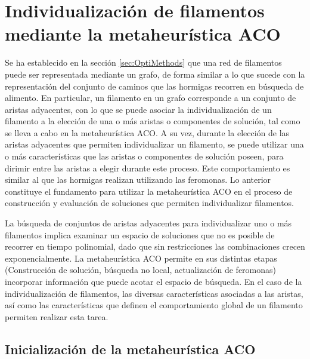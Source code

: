 \section{Individualizaci\'on de filamentos mediante la metaheur\'istica ACO}
Se ha establecido en la secci\'on \ref{sec:OptiMethods} que una red de filamentos puede ser representada mediante un grafo, de forma similar a lo que sucede con la representaci\'on del conjunto de caminos que las hormigas recorren en b\'usqueda de alimento. En particular, un filamento en un grafo corresponde a un conjunto de aristas adyacentes, con lo que se puede asociar la individualizaci\'on de un filamento a la elecci\'on de una o m\'as aristas o componentes de soluci\'on, tal como se lleva a cabo en la metaheur\'istica ACO. A su vez, durante la elecci\'on de las aristas adyacentes que permiten individualizar un filamento, se puede utilizar una o m\'as caracter\'isticas que las aristas o componentes de soluci\'on poseen, para dirimir entre las aristas a elegir durante este proceso. Este comportamiento es similar al que las hormigas realizan utilizando las feromonas. Lo anterior constituye el fundamento para utilizar la metaheur\'istica ACO en el proceso de construcci\'on y evaluaci\'on de soluciones que permiten individualizar filamentos.

La b\'usqueda de conjuntos de aristas adyacentes para individualizar uno o m\'as filamentos implica examinar un espacio de soluciones que no es posible de recorrer en tiempo polinomial, dado que sin restricciones las combinaciones crecen exponencialmente\cite{buchin2007number}\cite{biswas2012hamiltonian}. La metaheur\'istica ACO permite en sus distintas etapas (Construcci\'on de soluci\'on, b\'usqueda no local, actualizaci\'on de feromonas) incorporar informaci\'on que puede acotar el espacio de b\'usqueda. En el caso de la individualizaci\'on de filamentos, las diversas caracter\'isticas asociadas a las aristas, as\'i como las caracter\'isticas que definen el comportamiento global de un filamento permiten realizar esta tarea. 

\subsection{Inicializaci\'on de la metaheur\'istica ACO}

